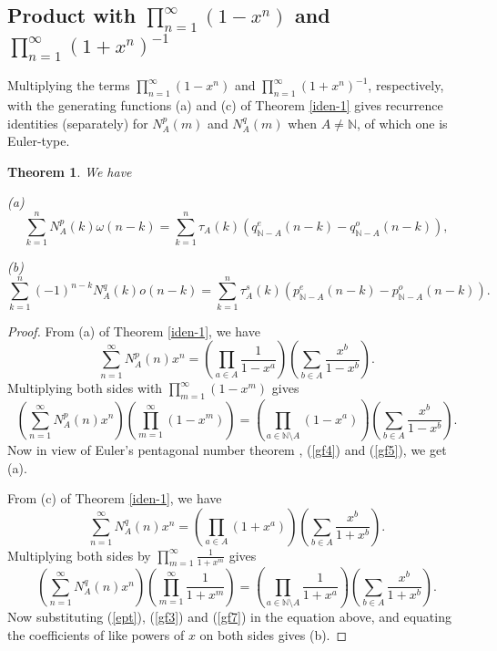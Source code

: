 \documentclass[11pt]{article}
\newtheorem{theorem}{Theorem}
\begin{document}
\subsection{ Product with $\prod_{n=1}^{\infty}(1-x^n)$ and $\prod_{n=1}^{\infty}(1+x^n)^{-1}$}
Multiplying the terms $\prod_{n=1}^{\infty}(1-x^n)$ and $\prod_{n=1}^{\infty}(1+x^n)^{-1}$, respectively, with the generating functions (a) and (c) of Theorem \ref{iden-1} gives recurrence identities (separately)  for $N^p_A(m)$ and $N^q_A(m)$ when $A\neq\mathbb N$, of which one is Euler-type.
\begin{theorem}\label{iden-3}
We have
\begin{description}
\item{(a)}
\begin{equation}
\sum_{k=1}^{n}N^p_A(k)\omega(n-k)=\sum_{k=1}^{n}\tau_A(k)\left(q_{\mathbb N-A}^e(n-k)-q_{\mathbb N-A}^o(n-k)\right),
\end{equation}
\item{(b)}
\begin{equation}
\sum_{k=1}^n(-1)^{n-k}N^q_A(k)o(n-k)=\sum_{k=1}^{n}\tau_A^s(k)\left(p_{\mathbb N-A}^e(n-k)-p_{\mathbb N-A}^o(n-k)\right).
\end{equation}
\end{description} 
\end{theorem}
\begin{proof}
From (a) of Theorem \ref{iden-1}, we have
\[\sum_{n=1}^{\infty}N^p_A(n)x^n=\left(\prod_{a\in A}\frac{1}{1-x^a}\right)\left(\sum_{b\in A}\frac{x^b}{1-x^b}\right).
\]
Multiplying both sides with $\prod_{m=1}^{\infty}(1-x^m)$ gives 
\[\left(\sum_{n=1}^{\infty}N^p_A(n)x^n\right)\left(\prod_{m=1}^{\infty}(1-x^m)\right)=\left(\prod_{a\in\mathbb N\setminus A}(1-x^a)\right)\left(\sum_{b\in A}\frac{x^b}{1-x^b}\right).
\]
Now in view of Euler's pentagonal number theorem \cite{euler-pnt}, (\ref{gf4}) and (\ref{gf5}), we get (a).

From (c) of Theorem \ref{iden-1}, we have
\[\sum_{n=1}^{\infty}N^q_A(n)x^n=\left(\prod_{a\in A}(1+x^a)\right)\left(\sum_{b\in A}\frac{x^b}{1+x^b}\right).
\]
Multiplying both sides by $\prod_{m=1}^{\infty}\frac{1}{1+x^m}$ gives 
\begin{equation}\label{prod-lemma}
\left(\sum_{n=1}^{\infty}N^q_A(n)x^n\right)\left(\prod_{m=1}^{\infty}\frac{1}{1+x^m}\right)=\left(\prod_{a\in \mathbb N\setminus A}\frac{1}{1+x^a}\right)\left(\sum_{b\in A}\frac{x^b}{1+x^b}\right).
\end{equation}
Now substituting (\ref{ept}), (\ref{gf3}) and (\ref{gf7}) in the equation above, and equating the coefficients of like powers of $x$ on both sides gives (b).  
\end{proof}
\end{document}
